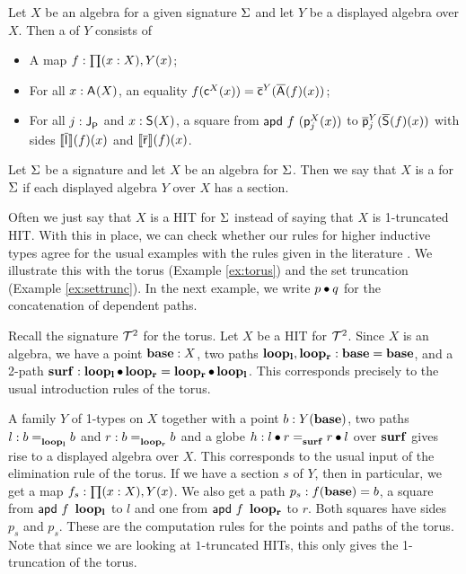 \begin{definition}
\label{def:section}
Let $X$ be an algebra for a given signature $\Sigma$ and let $Y$ be a displayed algebra over $X$.
Then a  of $Y$ consists of
\begin{itemize}
	\item A map $f : \prod (x : X) , Y(x)$;
	\item For all $x : \mathsf{A}^{}(X)$, an equality $f(\mathsf{c}^{X}(x)) = \overline{\mathsf{c}}^{Y}(\overline{\mathsf{A}^{}}(f)(x))$;
	\item For all $j : \mathsf{J}^{}_{\mathsf{P}}$ and $x : \mathsf{S}^{}(X)$, a square from
	$\mathsf{apd} \ f \ (\mathsf{p}^{X}_{j}(x))$
	to
	$\overline{\mathsf{p}}^{Y}_{j}(\overline{\mathsf{S}^{}}(f)(x))$
	with sides
	$\llbracket \overline{\mathsf{l}^{}} \rrbracket(f)(x)$
	and
	$\llbracket \overline{\mathsf{r}^{}} \rrbracket(f)(x)$.
\end{itemize}
\end{definition}

\begin{definition}
Let $\Sigma$ be a signature and let $X$ be an algebra for $\Sigma$.
Then we say that $X$ is a  for $\Sigma$ if each displayed algebra $Y$ over $X$ has a section.
\end{definition}

Often we just say that $X$ is a HIT for $\Sigma$ instead of saying that $X$ is 1-truncated HIT.
With this in place, we can check whether our rules for higher inductive types
agree for the usual examples with the rules given in the literature \cite{hottbook}.
We illustrate this with the torus (Example \ref{ex:torus}) and the set truncation (Example \ref{ex:settrunc}).
In the next example, we write $p \bullet q$ for the concatenation of dependent paths.

\begin{example}
Recall the signature $\mathcal{T}^2$ for the torus.
Let $X$ be a HIT for $\mathcal{T}^2$.
Since $X$ is an algebra, we have a point $\operatorname{\mathbf{base}} : X$, two paths $\operatorname{\mathbf{loop_l}}, \operatorname{\mathbf{loop_r}} : \operatorname{\mathbf{base}} = \operatorname{\mathbf{base}}$,
and a 2-path $\operatorname{\mathbf{surf}} : \operatorname{\mathbf{loop_l}} \bullet \operatorname{\mathbf{loop_r}} = \operatorname{\mathbf{loop_r}} \bullet \operatorname{\mathbf{loop_l}}$.
This corresponds precisely to the usual introduction rules of the torus.

A family $Y$ of 1-types on $X$ together with a point $b : Y(\operatorname{\mathbf{base}})$,
two paths $l : b =_{\operatorname{\mathbf{loop_l}}}^{} b$ and $r : b =_{\operatorname{\mathbf{loop_r}}}^{} b$
and a globe $h : l \bullet r =_{\operatorname{\mathbf{surf}}}^{} r \bullet l$
over $\operatorname{\mathbf{surf}}$ gives rise to a displayed algebra over $X$.
This corresponds to the usual input of the elimination rule of the torus.
If we have a section $s$ of $Y$, then in particular, we get a map $f_s : \prod (x : X) , Y(x)$.
We also get a path $p_s : f(\operatorname{\mathbf{base}}) = b$, a square from $\mathsf{apd} \ f \ \operatorname{\mathbf{loop_l}}$ to $l$ and one from $\mathsf{apd} \ f \ \operatorname{\mathbf{loop_r}}$ to $r$.
Both squares have sides $p_s$ and $p_s$.
These are the computation rules for the points and paths of the torus.
Note that since we are looking at $1$-truncated HITs, this only gives the 1-truncation of the torus.
\end{example}

